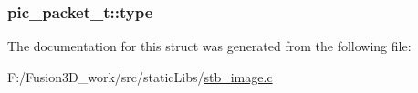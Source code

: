 \subsubsection[{type}]{ pic\+\_\+packet\+\_\+t\+::type}\label{structpic__packet__t_abc346cfdcff43f051830335296f14aaa}


The documentation for this struct was generated from the following file\+:\begin{DoxyCompactItemize}
\item 
F\+:/\+Fusion3\+D\+\_\+work/src/static\+Libs/\hyperlink{stb__image_8c}{stb\+\_\+image.\+c}\end{DoxyCompactItemize}
